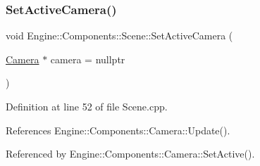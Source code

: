 \subsubsection{\texorpdfstring{Set\+Active\+Camera()}{SetActiveCamera()}}
{\footnotesize\ttfamily void Engine\+::\+Components\+::\+Scene\+::\+Set\+Active\+Camera (\begin{DoxyParamCaption}\item[{\mbox{\hyperlink{classEngine_1_1Components_1_1Camera}{Camera}} $\ast$}]{camera = {\ttfamily nullptr} }\end{DoxyParamCaption})\hspace{0.3cm}{\ttfamily [virtual]}}



Definition at line 52 of file Scene.\+cpp.



References Engine\+::\+Components\+::\+Camera\+::\+Update().



Referenced by Engine\+::\+Components\+::\+Camera\+::\+Set\+Active().


